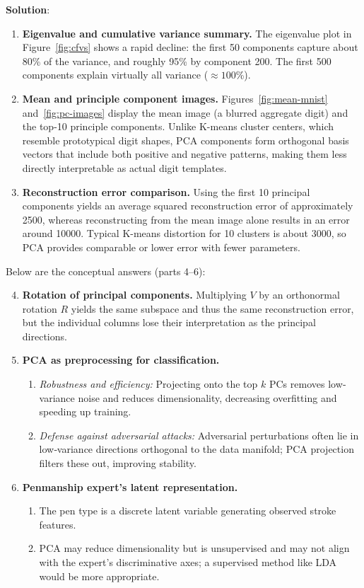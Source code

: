 \documentclass[submit]{../harvardml}
\newenvironment{solution}{
    \vspace{2mm}
    \color{blue}\noindent\textbf{Solution}:
}{}
\begin{document}
\begin{solution}
\begin{enumerate}
\item \textbf{Eigenvalue and cumulative variance summary.} The eigenvalue plot in Figure~\ref{fig:cfvs} shows a rapid decline: the first 50 components capture about 80\% of the variance, and roughly 95\% by component 200. The first 500 components explain virtually all variance ($\approx100$\%).

\item \textbf{Mean and principle component images.} Figures~\ref{fig:mean-mnist} and~\ref{fig:pc-images} display the mean image (a blurred aggregate digit) and the top-10 principle components. Unlike K-means cluster centers, which resemble prototypical digit shapes, PCA components form orthogonal basis vectors that include both positive and negative patterns, making them less directly interpretable as actual digit templates.

\item \textbf{Reconstruction error comparison.} Using the first 10 principal components yields an average squared reconstruction error of approximately 2500, whereas reconstructing from the mean image alone results in an error around 10000. Typical K-means distortion for 10 clusters is about 3000, so PCA provides comparable or lower error with fewer parameters.
\end{enumerate}

Below are the conceptual answers (parts 4–6):

\begin{enumerate}
\setcounter{enumi}{3}
\item \textbf{Rotation of principal components.}  
  Multiplying $V$ by an orthonormal rotation $R$ yields the same subspace and thus the same reconstruction error, but the individual columns lose their interpretation as the principal directions.

\item \textbf{PCA as preprocessing for classification.}
  \begin{enumerate}
    \item \emph{Robustness and efficiency:} Projecting onto the top $k$ PCs removes low‐variance noise and reduces dimensionality, decreasing overfitting and speeding up training.
    \item \emph{Defense against adversarial attacks:} Adversarial perturbations often lie in low‐variance directions orthogonal to the data manifold; PCA projection filters these out, improving stability.
  \end{enumerate}

\item \textbf{Penmanship expert’s latent representation.}
  \begin{enumerate}
    \item The pen type is a discrete latent variable generating observed stroke features.
    \item PCA may reduce dimensionality but is unsupervised and may not align with the expert’s discriminative axes; a supervised method like LDA would be more appropriate.
  \end{enumerate}
\end{enumerate}
\end{solution}
\end{document}
